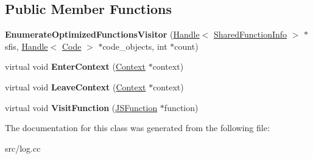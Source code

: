 \subsection*{Public Member Functions}
\begin{DoxyCompactItemize}
\item 
\hypertarget{classv8_1_1internal_1_1_enumerate_optimized_functions_visitor_ae40a329a977879eafbcef74547eb22cc}{}{\bfseries Enumerate\+Optimized\+Functions\+Visitor} (\hyperlink{classv8_1_1internal_1_1_handle}{Handle}$<$ \hyperlink{classv8_1_1internal_1_1_shared_function_info}{Shared\+Function\+Info} $>$ $\ast$sfis, \hyperlink{classv8_1_1internal_1_1_handle}{Handle}$<$ \hyperlink{classv8_1_1internal_1_1_code}{Code} $>$ $\ast$code\+\_\+objects, int $\ast$count)\label{classv8_1_1internal_1_1_enumerate_optimized_functions_visitor_ae40a329a977879eafbcef74547eb22cc}

\item 
\hypertarget{classv8_1_1internal_1_1_enumerate_optimized_functions_visitor_ad77518ea6c427f1e07b38fa55b73dadd}{}virtual void {\bfseries Enter\+Context} (\hyperlink{classv8_1_1internal_1_1_context}{Context} $\ast$context)\label{classv8_1_1internal_1_1_enumerate_optimized_functions_visitor_ad77518ea6c427f1e07b38fa55b73dadd}

\item 
\hypertarget{classv8_1_1internal_1_1_enumerate_optimized_functions_visitor_a1821ab118e0a7030801ee3b75f699f77}{}virtual void {\bfseries Leave\+Context} (\hyperlink{classv8_1_1internal_1_1_context}{Context} $\ast$context)\label{classv8_1_1internal_1_1_enumerate_optimized_functions_visitor_a1821ab118e0a7030801ee3b75f699f77}

\item 
\hypertarget{classv8_1_1internal_1_1_enumerate_optimized_functions_visitor_a72a2b7ddfe10eccf5991f66313be44fd}{}virtual void {\bfseries Visit\+Function} (\hyperlink{classv8_1_1internal_1_1_j_s_function}{J\+S\+Function} $\ast$function)\label{classv8_1_1internal_1_1_enumerate_optimized_functions_visitor_a72a2b7ddfe10eccf5991f66313be44fd}

\end{DoxyCompactItemize}


The documentation for this class was generated from the following file\+:\begin{DoxyCompactItemize}
\item 
src/log.\+cc\end{DoxyCompactItemize}
